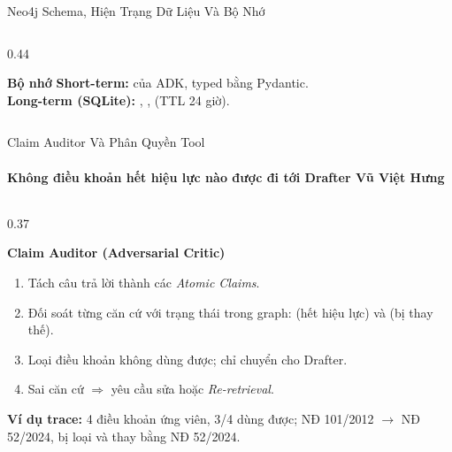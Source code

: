 \documentclass[aspectratio=1610,10pt,xcolor={table}]{beamer}
\begin{document}
\begin{frame}{Neo4j Schema, Hiện Trạng Dữ Liệu Và Bộ Nhớ}
\begin{columns}[c]
\begin{column}{0.44\textwidth}
      \vspace{0.2cm}
      \begin{block}{\textbf{Bộ nhớ}}
        \scriptsize
        \textbf{Short-term:}  của ADK, typed bằng Pydantic.\\
        \textbf{Long-term (SQLite):} , ,  (TTL 24 giờ).
      \end{block}
    \end{column}
  \end{columns}
\end{frame}

\begin{frame}{Claim Auditor Và Phân Quyền Tool}
  \framesubtitle{Không điều khoản hết hiệu lực nào được đi tới Drafter \hfill Vũ Việt Hưng}

  \begin{columns}[t]
    \begin{column}{0.37\textwidth}
      \begin{block}{\textbf{Claim Auditor (Adversarial Critic)}}
        \begin{enumerate}\footnotesize
          \item Tách câu trả lời thành các \emph{Atomic Claims}.
          \item Đối soát từng căn cứ với trạng thái trong graph:  (hết hiệu lực) và  (bị thay thế).
          \item Loại điều khoản không dùng được; chỉ chuyển  cho Drafter.
          \item Sai căn cứ $\Rightarrow$ yêu cầu sửa hoặc \emph{Re-retrieval}.
        \end{enumerate}
      \end{block}
      \begin{tcolorbox}[colback=red!4,colframe=darkred!70,boxrule=0.5pt,arc=1mm]
        \footnotesize\textbf{Ví dụ trace:} 4 điều khoản ứng viên, 3/4 dùng được; NĐ 101/2012 $\to$  NĐ 52/2024, bị loại và thay bằng NĐ 52/2024.
      \end{tcolorbox}
    \end{column}


\end{columns}
\end{frame}
\end{document}
